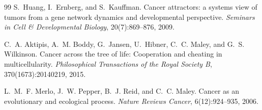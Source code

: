 \documentclass[11pt]{article}
\begin{document}
\begin{thebibliography}{99}
S.~Huang, I.~Ernberg, and S.~Kauffman.
\newblock Cancer attractors: a systems view of tumors from a gene network
  dynamics and developmental perspective.
\newblock \emph{Seminars in Cell \& Developmental Biology}, 20(7):869--876,
  2009.

C.~A. Aktipis, A.~M. Boddy, G.~Jansen, U.~Hibner, C.~C. Maley, and
  G.~S. Wilkinson.
\newblock Cancer across the tree of life: Cooperation and cheating in
  multicellularity.
\newblock \emph{Philosophical Transactions of the Royal Society B},
  370(1673):20140219, 2015.

L.~M.~F. Merlo, J.~W. Pepper, B.~J. Reid, and C.~C. Maley.
\newblock Cancer as an evolutionary and ecological process.
\newblock \emph{Nature Reviews Cancer}, 6(12):924--935, 2006.

\end{thebibliography}


\clearpage
\appendix
\end{document}
